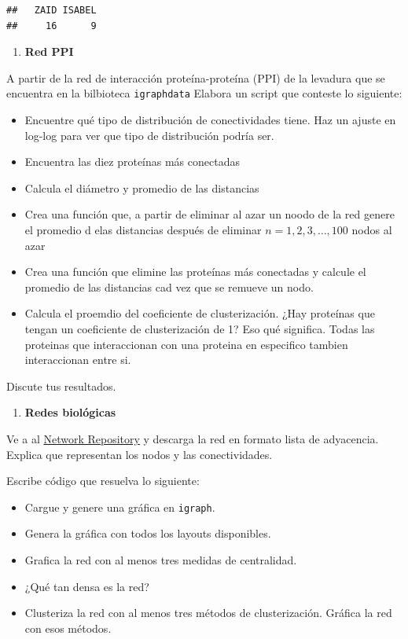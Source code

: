 \documentclass[
]{article}
\providecommand{\tightlist}{%
  \setlength{\itemsep}{0pt}\setlength{\parskip}{0pt}}
\begin{document}
\begin{verbatim}
##   ZAID ISABEL 
##     16      9
\end{verbatim}

\begin{enumerate}
\def\labelenumi{\arabic{enumi}.}
\setcounter{enumi}{2}
\tightlist
\item
  \textbf{Red PPI}
\end{enumerate}

A partir de la red de interacción proteína-proteína (PPI) de la levadura
que se encuentra en la bilbioteca \texttt{igraphdata} Elabora un script
que conteste lo siguiente:

\begin{itemize}
\tightlist
\item
  Encuentre qué tipo de distribución de conectividades tiene. Haz un
  ajuste en log-log para ver que tipo de distribución podría ser.
\item
  Encuentra las diez proteínas más conectadas
\item
  Calcula el diámetro y promedio de las distancias
\item
  Crea una función que, a partir de eliminar al azar un noodo de la red
  genere el promedio d elas distancias después de eliminar
  \(n=1,2,3,\ldots, 100\) nodos al azar
\item
  Crea una función que elimine las proteínas más conectadas y calcule el
  promedio de las distancias cad vez que se remueve un nodo.
\item
  Calcula el proemdio del coeficiente de clusterización. ¿Hay proteínas
  que tengan un coeficiente de clusterización de 1? Eso qué significa.
  Todas las proteinas que interaccionan con una proteina en especifico
  tambien interaccionan entre si.
\end{itemize}

Discute tus resultados.

\begin{enumerate}
\def\labelenumi{\arabic{enumi}.}
\setcounter{enumi}{3}
\tightlist
\item
  \textbf{Redes biológicas}
\end{enumerate}

Ve a al
\href{https://networkrepository.com/bn-mouse-visual-cortex-1.php}{Network
Repository} y descarga la red en formato lista de adyacencia. Explica
que representan los nodos y las conectividades.

Escribe código que resuelva lo siguiente:

\begin{itemize}
\tightlist
\item
  Cargue y genere una gráfica en \texttt{igraph}.
\item
  Genera la gráfica con todos los layouts disponibles.
\item
  Grafica la red con al menos tres medidas de centralidad.
\item
  ¿Qué tan densa es la red?
\item
  Clusteriza la red con al menos tres métodos de clusterización. Gráfica
  la red con esos métodos.
\end{itemize}
\end{document}

